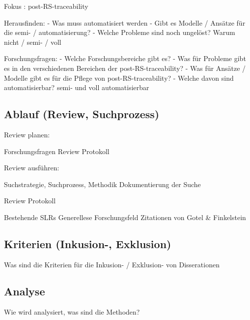 Fokus : post-RS-traceability

Herausfinden:
- Was muss automatisiert werden
- Gibt es Modelle / Ansätze für die semi- / automatisierung?
- Welche Probleme sind noch ungelöst? Warum nicht / semi- / voll

Forschungsfragen:
- Welche Forschungsbereiche gibt es?
- Was für Probleme gibt es in den verschiedenen Bereichen der post-RS-traceability?
- Was für Ansätze / Modelle gibt es für die Pflege von post-RS-traceability?
- Welche davon sind automatisierbar? semi- und voll automatisierbar

\subsection{Ablauf (Review, Suchprozess)}

Review planen:

Forschungsfragen
Review Protokoll

Review ausführen:

Suchstrategie, Suchprozess, Methodik
Dokumentierung der Suche

Review Protokoll

Bestehende SLRs
Generellese Forschungsfeld
Zitationen von Gotel \& Finkelstein

\subsection{Kriterien (Inkusion-, Exklusion)}

Was sind die Kriterien für die Inkusion- / Exklusion- von Disserationen

\subsection{Analyse}

Wie wird analysiert, was sind die Methoden?
